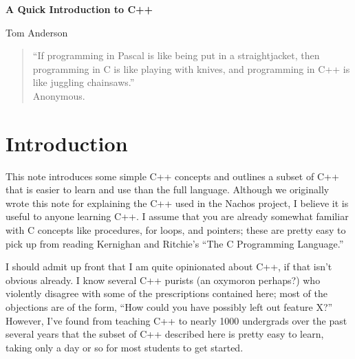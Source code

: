 
\newcommand{\putfig}[3]%
{\begin{figure}%
\centerline{%
\psfig{figure=#1.ps,width=#3}}%
\caption{#2}%
\label{fig:#1}%
\end{figure}}





\begin{figure*}[t]
\begin{center}
{\LARGE\bf A Quick Introduction to C++}

\vspace{3.0ex}

{\Large Tom Anderson}
\end{center}
\end{figure*}

\renewcommand{\thefootnote}{\fnsymbol{footnote}}


\renewcommand{\thefootnote}{}
\renewcommand{\thefootnote}{\arabic{footnote}}

\begin{quote}
``If programming in Pascal is like being put in a straightjacket,
then programming in C is like playing with knives, and programming
in C++ is like juggling chainsaws.'' \\ \hbox{} \hfill Anonymous.
\end{quote}

\section{Introduction}

This note introduces some simple C++ concepts and outlines a
subset of C++ that is easier to learn and use than
the full language.  Although we originally wrote this note for
explaining the C++ used in the Nachos project, I believe it is 
useful to anyone learning C++.
I assume that you are already somewhat familiar with C concepts
like procedures, for loops, and pointers; these are pretty easy
to pick up from reading Kernighan and Ritchie's ``The C Programming 
Language.''

I should admit up front that I am quite opinionated about C++, if
that isn't obvious already.
I know several C++ purists (an oxymoron perhaps?) who violently
disagree with some of
the prescriptions contained here; most of the objections are of
the form, ``How could you have possibly left out feature X?''
However, I've found from teaching C++ to nearly 1000 undergrads
over the past several years that the subset of C++ described here is
pretty easy to learn, taking only a day or so for most students 
to get started.

